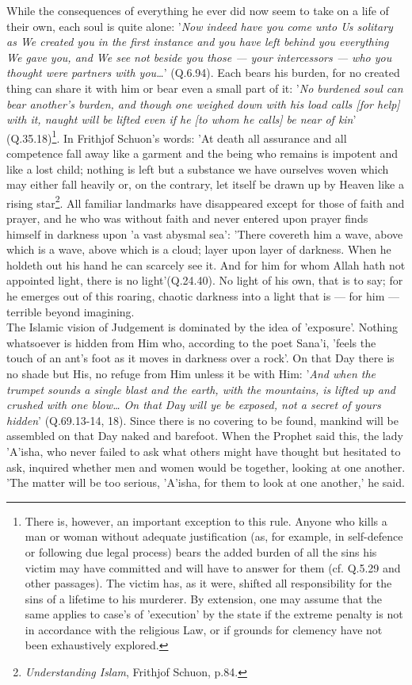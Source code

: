 \documentclass[11pt, b5paper, twoside]{book}
\begin{document}
While the consequences of everything he ever did now seem to take on a life of their own, each soul 
is quite alone: '\emph{Now indeed have you come unto Us solitary as We created you in the first instance 
and you have left behind you everything We gave you, and We see not beside you those --- your 
intercessors --- who you thought were partners with you\ldots{}}' (Q.6.94). Each bears his burden, for no 
created thing can share it with him or bear even a small part of it: '\emph{No burdened soul can bear 
another's burden, and though one weighed down with his load calls [for help] with it, naught will be 
lifted even if he [to whom he calls] be near of kin}' (Q.35.18)\footnote{There is, however, an important exception to this rule. Anyone who kills a man or woman without 
adequate justification (as, for example, in self-defence or following due legal process) bears the 
added burden of all the sins his victim may have committed and will have to answer for them (cf. 
Q.5.29 and other passages). The victim has, as it were, shifted all responsibility for the sins of a 
lifetime to his murderer. By extension, one may assume that the same applies to case's of 'execution' 
by the state if the extreme penalty is not in accordance with the religious Law, or if grounds for 
clemency have not been exhaustively explored.}. In Frithjof Schuon's words: 'At 
death all assurance and all competence fall away like a garment and the being who remains is impotent 
and like a lost child; nothing is left but a substance we have ourselves woven which may either fall 
heavily or, on the contrary, let itself be drawn up by Heaven like a rising star\footnote{\emph{Understanding Islam}, Frithjof Schuon, p.84.}. All familiar 
landmarks have disappeared except for those of faith and prayer, and he who was without faith and 
never entered upon prayer finds himself in darkness upon 'a vast abysmal sea': 'There covereth him a 
wave, above which is a wave, above which is a cloud; layer upon layer of darkness. When he holdeth 
out his hand he can scarcely see it. And for him for whom Allah hath not appointed light, there is no 
light'(Q.24.40). No light of his own, that is to say; for he emerges out of this roaring, chaotic 
darkness into a light that is --- for him --- terrible beyond imagining. \\

The Islamic vision of Judgement is dominated by the idea of 'exposure'. Nothing whatsoever is hidden 
from Him who, according to the poet Sana'i, 'feels the touch of an ant's foot as it moves in darkness 
over a rock'. On that Day there is no shade but His, no refuge from Him unless it be with Him: '\emph{And 
when the trumpet sounds a single blast and the earth, with the mountains, is lifted up and crushed 
with one blow\ldots{} On that Day will ye be exposed, not a secret of yours hidden}' (Q.69.13-14, 18). 
Since there is no covering to be found, mankind will be assembled on that Day naked and barefoot. 
When the Prophet said this, the lady 'A'isha, who never failed to ask what others might have thought 
but hesitated to ask, inquired whether men and women would be together, looking at one another. 'The 
matter will be too serious, 'A'isha, for them to look at one another,' he said. \\
\end{document}
